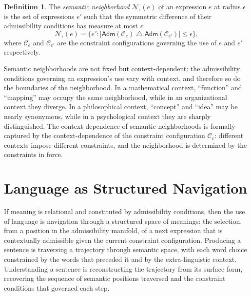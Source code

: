 \documentclass[12pt,openany]{book}
\theoremstyle{plain}
\theoremstyle{definition}
\newtheorem{definition}[theorem]{Definition}
\theoremstyle{remark}
\newcommand{\sadm}{\mathsf{Adm}}
\begin{document}
\begin{definition}
The \emph{semantic neighborhood} $\mathcal{N}_\epsilon(e)$ of an expression $e$ at radius $\epsilon$ is the set of expressions $e'$ such that the symmetric difference of their admissibility conditions has measure at most $\epsilon$:
\[
  \mathcal{N}_\epsilon(e) = \bigl\{ e' : \lvert \sadm(\mathcal{C}_e) \;\triangle\; \sadm(\mathcal{C}_{e'}) \rvert \leq \epsilon \bigr\},
\]
where $\mathcal{C}_e$ and $\mathcal{C}_{e'}$ are the constraint configurations governing the use of $e$ and $e'$ respectively.
\end{definition}

Semantic neighborhoods are not fixed but context-dependent: the admissibility conditions governing an expression's use vary with context, and therefore so do the boundaries of the neighborhood. In a mathematical context, \enquote{function} and \enquote{mapping} may occupy the same neighborhood, while in an organizational context they diverge. In a philosophical context, \enquote{concept} and \enquote{idea} may be nearly synonymous, while in a psychological context they are sharply distinguished. The context-dependence of semantic neighborhoods is formally captured by the context-dependence of the constraint configuration $\mathcal{C}_e$: different contexts impose different constraints, and the neighborhood is determined by the constraints in force.

\section{Language as Structured Navigation}

If meaning is relational and constituted by admissibility conditions, then the use of language is navigation through a structured space of meanings: the selection, from a position in the admissibility manifold, of a next expression that is contextually admissible given the current constraint configuration. Producing a sentence is traversing a trajectory through semantic space, with each word choice constrained by the words that preceded it and by the extra-linguistic context. Understanding a sentence is reconstructing the trajectory from its surface form, recovering the sequence of semantic positions traversed and the constraint conditions that governed each step.
\end{document}
